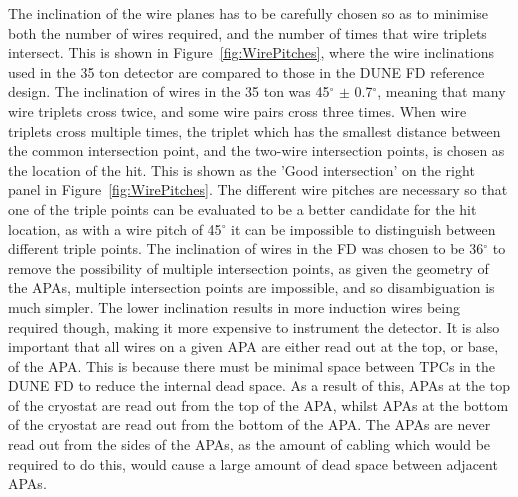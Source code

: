 The inclination of the wire planes has to be carefully chosen so as to minimise both the number of wires required, and the number of times that wire triplets intersect. This is shown in Figure~\ref{fig:WirePitches}, where the wire inclinations used in the 35 ton detector are compared to those in the DUNE FD reference design. The inclination of wires in the 35 ton was 45$^{\circ}$ $\pm$ 0.7$^{\circ}$, meaning that many wire triplets cross twice, and some wire pairs cross three times. When wire triplets cross multiple times, the triplet which has the smallest distance between the common intersection point, and the two-wire intersection points, is chosen as the location of the hit. This is shown as the 'Good intersection' on the right panel in Figure~\ref{fig:WirePitches}. The different wire pitches are necessary so that one of the triple points can be evaluated to be a better candidate for the hit location, as with a wire pitch of 45$^{\circ}$ it can be impossible to distinguish between different triple points. The inclination of wires in the FD was chosen to be 36$^{\circ}$ to remove the possibility of multiple intersection points, as given the geometry of the APAs, multiple intersection points are impossible, and so disambiguation is much simpler. The lower inclination results in more induction wires being required though, making it more expensive to instrument the detector. It is also important that all wires on a given APA are either read out at the top, or base, of the APA. This is because there must be minimal space between TPCs in the DUNE FD to reduce the internal dead space. As a result of this, APAs at the top of the cryostat are read out from the top of the APA, whilst APAs at the bottom of the cryostat are read out from the bottom of the APA. The APAs are never read out from the sides of the APAs, as the amount of cabling which would be required to do this, would cause a large amount of dead space between adjacent APAs. \\


